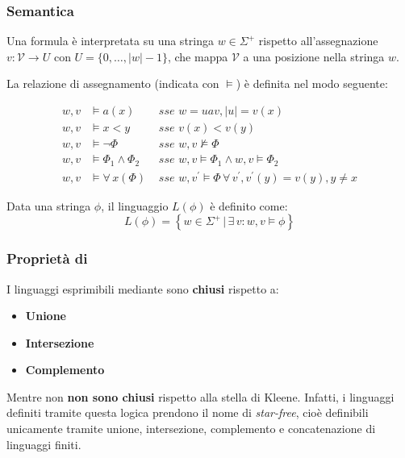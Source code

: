 \documentclass[italian, 10pt]{article}
\begin{document}
\subsubsection{Semantica}

Una formula \MFO è interpretata su una stringa \(w \in \Sigma^+\) rispetto all'assegnazione \(v : \mathcal{V} \rightarrow U\) con \(U = \{0, \ldots, |w| - 1 \} \), che mappa \(\mathcal{V}\) a una posizione nella stringa \(w\).

La relazione di assegnamento (indicata con \(\vDash\)) è definita nel modo seguente:

\begin{align*}
  w, v & \vDash a(x)                & \textit{ sse } w = uav, |u| = v(x)                                                          \\
  w, v & \vDash x < y               & \textit{ sse } v(x)  < v(y)                                                                 \\
  w, v & \vDash \lnot \Phi          & \textit{ sse } w, v \nvDash \Phi                                                            \\
  w, v & \vDash \Phi_1 \land \Phi_2 & \textit{ sse } w, v \vDash \Phi_1 \land w, v \vDash \Phi_2                                  \\
  w, v & \vDash \forall \, x(\Phi)  & \textit{ sse } w, v^\prime \vDash \Phi \, \forall \, v^\prime, v^\prime(y) = v(y), y \neq x
\end{align*}

Data una stringa \(\phi\), il linguaggio \(L(\phi)\) è definito come:
\[ L(\phi) = \left\{ w \in \Sigma^+ \, | \, \exists \, v :  w, v \vDash \phi \right\} \]

\subsubsection{Proprietà di \MFO}
\label{sec:proprieta-mfo}

I linguaggi esprimibili mediante \MFO sono \textbf{chiusi} rispetto a:

\begin{itemize}
  \item \textbf{Unione}
  \item \textbf{Intersezione}
  \item \textbf{Complemento}
\end{itemize}

Mentre non \textbf{non sono chiusi} rispetto alla stella di Kleene.
Infatti, i linguaggi definiti tramite questa logica prendono il nome di \textit{star-free}, cioè definibili unicamente tramite unione, intersezione, complemento e concatenazione di linguaggi finiti.
\end{document}
